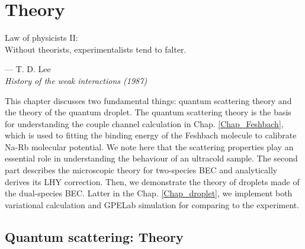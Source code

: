 \chapter{Theory}
\label{Chap:theory}

\setlength{\unitlength}{1pt}
\setlength{\epigraphwidth}{10cm}
\epigraph{Law of physicists II: \\ Without theorists, experimentalists tend to falter. \cite{Lee:1992ui}}{--- T. D. Lee\\ \textit{History of the weak interactions (1987)}}

This chapter discusses two fundamental things: quantum scattering theory and the theory of the quantum droplet. The quantum scattering theory is the basis for understanding the couple channel calculation in Chap. \ref{Chap_Feshbach}, which is used to fitting the binding energy of the Feshbach molecule to calibrate Na-Rb molecular potential. We note here that the scattering properties play an essential role in understanding the behaviour of an ultracold sample. The second part describes the microscopic theory for two-species BEC and analytically derives its LHY correction. Then, we demonstrate the theory of droplets made of the dual-species BEC. Latter in the Chap. \ref{Chap_droplet}, we implement both variational calculation and GPELab simulation for comparing to the experiment.

\section{Quantum scattering: Theory}
\label{sec:quan_scat}

